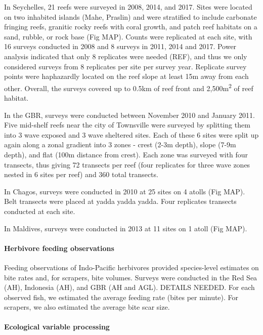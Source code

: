 \documentclass[]{article}
\let\oldparagraph\paragraph
\renewcommand{\paragraph}[1]{\oldparagraph{#1}\mbox{}}
\begin{document}
In Seychelles, 21 reefs were surveyed in 2008, 2014, and 2017. Sites
were located on two inhabited islands (Mahe, Praslin) and were
stratified to include carbonate fringing reefs, granitic rocky reefs
with coral growth, and patch reef habitats on a sand, rubble, or rock
base (Fig MAP). Counts were replicated at each site, with 16 surveys
conducted in 2008 and 8 surveys in 2011, 2014 and 2017. Power analysis
indicated that only 8 replicates were needed (REF), and thus we only
considered surveys from 8 replicates per site per survey year. Replicate
survey points were haphazardly located on the reef slope at least 15m
away from each other. Overall, the surveys covered up to 0.5km of reef
front and 2,500m\textsuperscript{2} of reef habitat.

In the GBR, surveys were conducted between November 2010 and January
2011. Five mid-shelf reefs near the city of Townsville were surveyed by
splitting them into 3 wave exposed and 3 wave sheltered sites. Each of
these 6 sites were split up again along a zonal gradient into 3 zones -
crest (2-3m depth), slope (7-9m depth), and flat (100m distance from
crest). Each zone was surveyed with four transects, thus giving 72
transects per reef (four replicates for three wave zones nested in 6
sites per reef) and 360 total transects.

In Chagos, surveys were conducted in 2010 at 25 sites on 4 atolls (Fig
MAP). Belt transects were placed at yadda yadda yadda. Four replicates
transects conducted at each site.

In Maldives, surveys were conducted in 2013 at 11 sites on 1 atoll (Fig
MAP).

\paragraph{Herbivore feeding
observations}\label{herbivore-feeding-observations}

Feeding observations of Indo-Pacific herbivores provided species-level
estimates on bite rates and, for scrapers, bite volumes. Surveys were
conducted in the Red Sea (AH), Indonesia (AH), and GBR (AH and AGL).
DETAILS NEEDED. For each observed fish, we estimated the average feeding
rate (bites per minute). For scrapers, we also estimated the average
bite scar size.

\paragraph{Ecological variable
processing}\label{ecological-variable-processing}
\end{document}

